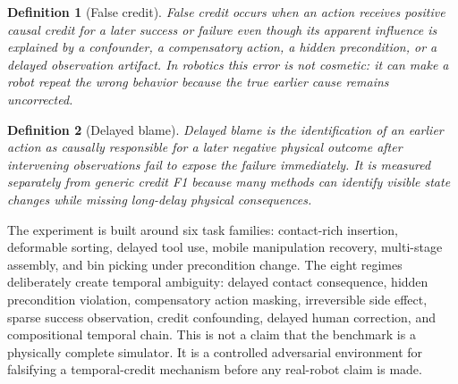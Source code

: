 \documentclass{article}
\newtheorem{definition}{Definition}
\begin{document}
\begin{definition}[False credit]
False credit occurs when an action receives positive causal credit for a later success or failure even though its apparent influence is explained by a confounder, a compensatory action, a hidden precondition, or a delayed observation artifact. In robotics this error is not cosmetic: it can make a robot repeat the wrong behavior because the true earlier cause remains uncorrected.
\end{definition}

\begin{definition}[Delayed blame]
Delayed blame is the identification of an earlier action as causally responsible for a later negative physical outcome after intervening observations fail to expose the failure immediately. It is measured separately from generic credit F1 because many methods can identify visible state changes while missing long-delay physical consequences.
\end{definition}

The experiment is built around six task families: contact-rich insertion, deformable sorting, delayed tool use, mobile manipulation recovery, multi-stage assembly, and bin picking under precondition change. The eight regimes deliberately create temporal ambiguity: delayed contact consequence, hidden precondition violation, compensatory action masking, irreversible side effect, sparse success observation, credit confounding, delayed human correction, and compositional temporal chain. This is not a claim that the benchmark is a physically complete simulator. It is a controlled adversarial environment for falsifying a temporal-credit mechanism before any real-robot claim is made.
\end{document}
